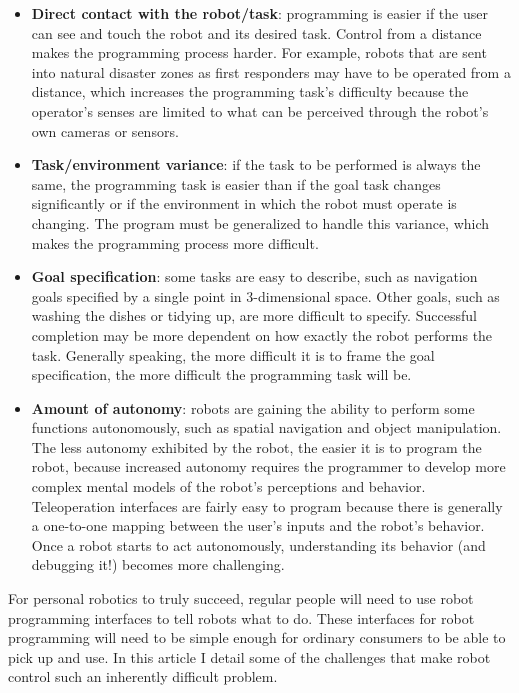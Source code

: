 \documentclass[10pt,twocolumn]{article}
\begin{document}
\begin{itemize}
\item {\bf Direct contact with the robot/task}: programming is easier if the user can see and touch the robot and its desired task. Control from a distance makes the programming process harder. For example, robots that are sent into natural disaster zones as first responders may have to be operated from a distance, which increases the programming task's difficulty because the operator's senses are limited to what can be perceived through the robot's own cameras or sensors.

\item {\bf Task/environment variance}: if the task to be performed is always the same, the programming task is easier than if the goal task changes significantly or if the environment in which the robot must operate is changing. The program must be generalized to handle this variance, which makes the programming process more difficult.

\item {\bf Goal specification}: some tasks are easy to describe, such as navigation goals specified by a single point in 3-dimensional space. Other goals, such as washing the dishes or tidying up, are more difficult to specify. Successful completion may be more dependent on how exactly the robot performs the task. Generally speaking, the more difficult it is to frame the goal specification, the more difficult the programming task will be.

\item {\bf Amount of autonomy}: robots are gaining the ability to perform some functions autonomously, such as spatial navigation and object manipulation.  The less autonomy exhibited by the robot, the easier it is to program the robot, because increased autonomy requires the programmer to develop more complex mental models of the robot's perceptions and behavior. Teleoperation interfaces are fairly easy to program because there is generally a one-to-one mapping between the user's inputs and the robot's behavior. Once a robot starts to act autonomously, understanding its behavior (and debugging it!) becomes more challenging.
\end{itemize}

For personal robotics to truly succeed, regular people will need to use robot programming interfaces to tell robots what to do. These interfaces for robot programming will need to be simple enough for ordinary consumers to be able to pick up and use. In this article I detail some of the challenges that make robot control such an inherently difficult problem.
\end{document}
